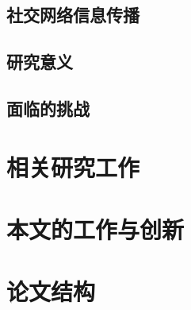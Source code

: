 \subsection{社交网络信息传播}
\label{subsec1:informationDiffusion}

\subsection{研究意义}
\label{subsec1:researchSignificance}

\subsection{面临的挑战}
\label{subsec1:challenge}

\section{相关研究工作}
\label{sec1:relatedWorks}

\section{本文的工作与创新}
\label{sec1:inovation}

\section{论文结构}
\label{sec1:paperStructure}